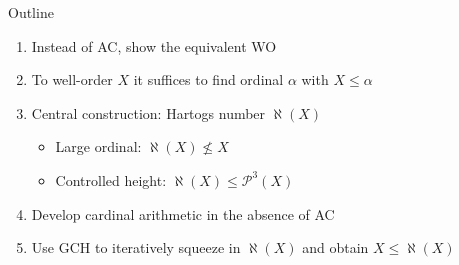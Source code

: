 \documentclass[xcolor=dvipsnames,compress,aspectratio=169]{beamer}
\newcommand{\MBB}[1]{\ensuremath{\mathbb{#1}}\xspace}  %
\newcommand{\MCL}[1]{\ensuremath{\mathcal{#1}}\xspace} %
\newcommand{\Nat}{\MBB{N}}   %
\newcommand{\Pow}{\MCL P}
\newcommand{\hartogsNumber}{\aleph}
\begin{document}
\begin{frame}{Outline}
	\begin{enumerate}[<+->]
			\item
			Instead of AC, show the equivalent WO
			\vspace{0.4cm}
			\item
			To well-order $X$ it suffices to find ordinal $\alpha$ with $X\le \alpha$
			\vspace{0.4cm}
			\item
			Central construction: Hartogs number $\hartogsNumber(X)$
			\begin{itemize}
				\item
				\vspace{0.2cm}
				Large ordinal: $\hartogsNumber(X)\not\le X$
				\vspace{0.2cm}
				\item
				Controlled height: $\hartogsNumber(X)\le\Pow^3(X)$
			\end{itemize}
			\vspace{0.4cm}
			\item
			Develop cardinal arithmetic in the absence of AC
			\vspace{0.4cm}
			\item
			Use GCH to iteratively squeeze in $\hartogsNumber(X)$ and obtain $X\le \hartogsNumber(X)$
		\end{enumerate}
\end{frame}
\end{document}
